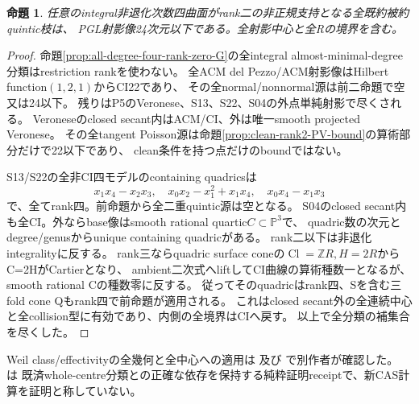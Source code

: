 \documentclass[a4paper,11pt]{ltjsarticle}
\newtheorem{proposition}{命題}[section]
\theoremstyle{definition}
\begin{document}
\begin{proposition}\label{prop:degree-four-ranktwo-all-G}
任意のintegral非退化次数四曲面がrank二の非正規支持となる全既約被約quintic枝は、
PGL射影像24次元以下である。全射影中心と全Rの境界を含む。
\end{proposition}
\begin{proof}
命題\ref{prop:all-degree-four-rank-zero-G}の全integral almost-minimal-degree分類はrestriction rankを使わない。
全ACM del Pezzo/ACM射影像はHilbert function$(1,2,1)$からCI22であり、
その全normal/nonnormal源は前二命題で空又は24以下。
残りはP5のVeronese、S13、S22、S04の外点単純射影で尽くされる。
Veroneseのclosed secant内はACM/CI、外は唯一smooth projected Veronese。
その全tangent Poisson源は命題\ref{prop:clean-rank2-PV-bound}の算術部分だけで22以下であり、
clean条件を持つ点だけのboundではない。

S13/S22の全非CI四モデルのcontaining quadricsは
\[
 x_1x_4-x_2x_3,\quad x_0x_2-x_1^2+x_1x_4,\quad x_0x_4-x_1x_3
\]
で、全てrank四。前命題から全二重quintic源は空となる。
S04のclosed secant内も全CI。外ならbase像はsmooth rational quartic$C\subset\mathbb P^3$で、
quadric数の次元とdegree/genusからunique containing quadricがある。
rank二以下は非退化integralityに反する。
rank三ならquadric surface coneの$\operatorname{Cl}=\mathbb ZR,H=2R$からC=2HがCartierとなり、
ambient二次式へliftしてCI曲線の算術種数一となるが、smooth rational Cの種数零に反する。
従ってそのquadricはrank四、Sを含む三fold cone Qもrank四で前命題が適用される。
これはclosed secant外の全連続中心と全collision型に有効であり、内側の全境界はCIへ戻す。
以上で全分類の補集合を尽くした。
\end{proof}
Weil class/effectivityの全幾何と全中心への適用は
及び
で別作者が確認した。
は
既済whole-centre分類との正確な依存を保持する純粋証明receiptで、新CAS計算を証明と称していない。
\end{document}
